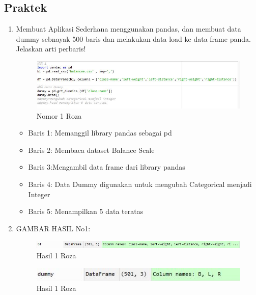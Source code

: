 \begin{enumerate}
\subsection{Praktek}
\begin{enumerate}
\item Membuat Aplikasi Sederhana menggunakan pandas, dan membuat data dummy sebnayak 500 baris dan melakukan data load ke data frame panda. Jelaskan arti perbaris!
\begin{figure}[!hbtp]
\centering
\includegraphics[scale=0.8]{figures/kodinganroza1.jpg}
\caption{Nomor 1 Roza}
\label{text-fadila}
\end{figure}
\begin{itemize}
\item Baris 1: Memanggil library pandas sebagai pd
\item Baris 2: Membaca dataset Balance Scale 
\item Baris 3:Mengambil data frame dari library pandas
\item Baris 4: Data Dummy digunakan untuk mengubah Categorical menjadi Integer
\item Baris 5: Menampilkan 5 data teratas
\par
\end{itemize}
\item GAMBAR HASIL No1:
\begin{figure}[!hbtp]
\centering
\includegraphics[scale=0.7]{figures/hasil1a.jpg}
\caption{Hasil 1 Roza}
\label{text-fadila}
\end{figure}
\begin{figure}[!hbtp]
\centering
\includegraphics[scale=0.9]{figures/hasil1b.jpg}
\caption{Hasil 1 Roza}
\label{text-fadila}
\end{figure}
\par


\end{enumerate}
\end{enumerate}
